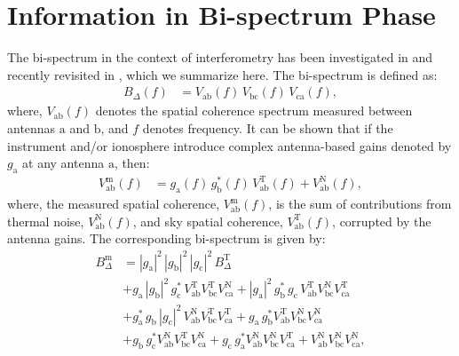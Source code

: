 \documentclass[
reprint,
superscriptaddress,
amsmath,
amssymb,
aps,
prd
]{revtex4-1}
\begin{document}
\section{Information in Bi-spectrum Phase}\label{sec:CPinfo}

The bi-spectrum in the context of interferometry has been investigated in \cite{jen58,kul89,tay99,tho01} and recently revisited in \cite{car18}, which we summarize here. The bi-spectrum is defined as:
\begin{align}
  B_\Delta(f) &= V_\textrm{ab}(f)\,V_\textrm{bc}(f)\,V_\textrm{ca}(f),
\end{align}
where, $V_\textrm{ab}(f)$ denotes the spatial coherence spectrum measured between antennas $\textrm{a}$ and $\textrm{b}$, and $f$ denotes frequency. It can be shown that if the instrument and/or ionosphere introduce complex antenna-based gains denoted by $g_\textrm{a}$ at any antenna $\textrm{a}$, then: 
\begin{align}
  V_\textrm{ab}^\textrm{m}(f) &= g_\textrm{a}(f)\, g_\textrm{b}^*(f)\, V_\textrm{ab}^\textrm{T}(f) + V_\textrm{ab}^\textrm{N}(f),
\end{align}
where, the measured spatial coherence, $V_\textrm{ab}^\textrm{m}(f)$, is the sum of contributions from thermal noise, $V_\textrm{ab}^\textrm{N}(f)$, and sky spatial coherence, $V_\textrm{ab}^\textrm{T}(f)$, corrupted by the antenna gains. The corresponding bi-spectrum is given by:
\begin{align}\label{eqn:bispectrum-terms}
  B_\Delta^\textrm{m} &= |g_\textrm{a}|^2\, |g_\textrm{b}|^2\, |g_\textrm{c}|^2\, B_\Delta^\textrm{T} \\
  &+ g_\textrm{a}\,|g_\textrm{b}|^2\,g_\textrm{c}^*\,V_\textrm{ab}^\textrm{T}V_\textrm{bc}^\textrm{T}V_\textrm{ca}^\textrm{N} + |g_\textrm{a}|^2\,g_\textrm{b}^*\,g_\textrm{c}\,V_\textrm{ab}^\textrm{T}V_\textrm{bc}^\textrm{N}V_\textrm{ca}^\textrm{T} \nonumber \\
  &+ g_\textrm{a}^*\,g_\textrm{b}\,|g_\textrm{c}|^2\,V_\textrm{ab}^\textrm{N}V_\textrm{bc}^\textrm{T}V_\textrm{ca}^\textrm{T} + g_\textrm{a}\,g_\textrm{b}^*V_\textrm{ab}^\textrm{T}V_\textrm{bc}^\textrm{N}V_\textrm{ca}^\textrm{N} \nonumber \\
  &+ g_\textrm{b}\,g_\textrm{c}^*V_\textrm{ab}^\textrm{N}V_\textrm{bc}^\textrm{T}V_\textrm{ca}^\textrm{N} + g_\textrm{c}\,g_\textrm{a}^*V_\textrm{ab}^\textrm{N}V_\textrm{bc}^\textrm{N}V_\textrm{ca}^\textrm{T} + V_\textrm{ab}^\textrm{N}V_\textrm{bc}^\textrm{N}V_\textrm{ca}^\textrm{N}, \nonumber 
\end{align}
\end{document}
